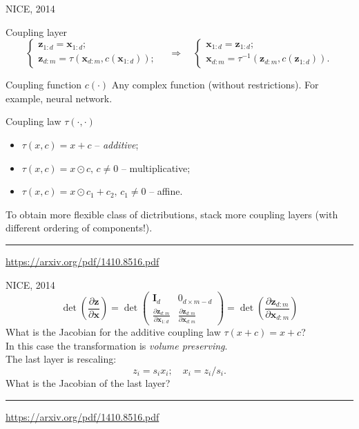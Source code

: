 \documentclass{beamer}
\newcommand{\bx}{\mathbf{x}}
\newcommand{\bz}{\mathbf{z}}
\newcommand{\bI}{\mathbf{I}}
\begin{document}
\begin{frame}{NICE, 2014}
	\begin{block}{Coupling layer}
		\vspace{-0.5cm}
		\begin{equation*}
			\begin{cases} \bz_{1:d} = \bx_{1:d}; \\ \bz_{d:m} = \tau (\bx_{d:m}, c(\bx_{1:d}));\end{cases} 
			\quad \Rightarrow \quad 
			\begin{cases} \bx_{1:d} = \bz_{1:d}; \\ \bx_{d:m} = \tau^{-1} (\bz_{d:m}, c(\bz_{1:d})).\end{cases}
		\end{equation*}
		\vspace{-0.5cm}
	\end{block}
	\begin{block}{Coupling function $c(\cdot)$}
		Any complex function (without restrictions). For example, neural network.
	\end{block}
	\begin{block}{Coupling law $\tau(\cdot, \cdot)$}
		\begin{itemize}
			\item $\tau(x, c) = x + c$ -- \textit{additive};
			\item $\tau(x, c) = x \odot c, \, c \neq 0$ -- multiplicative;
			\item $\tau(x, c) = x \odot c_1 + c_2, \, c_1 \neq 0$ -- affine.
		\end{itemize}
	\end{block}
	To obtain more flexible class of dictributions, stack more coupling layers (with different ordering of components!). \\
	
	\vfill
	\hrule\medskip
	{\scriptsize \href{https://arxiv.org/pdf/1410.8516.pdf}{https://arxiv.org/pdf/1410.8516.pdf}} 
\end{frame}
\begin{frame}{NICE, 2014}
	\[
	\det \left( \frac{\partial \bz}{\partial \bx} \right) = \det 
	\begin{pmatrix}
		\bI_d & 0_{d \times m - d} \\
		\frac{\partial \bz_{d:m}}{\partial \bx_{1:d}} & \frac{\partial \bz_{d:m}}{\partial \bx_{d:m}}
	\end{pmatrix} = 
	\det \left( \frac{\partial \bz_{d:m}}{\partial \bx_{d:m}} \right)
	\]
	What is the Jacobian for the additive coupling law $\tau(x + c) = x + c$? \\
	In this case the transformation is \textit{volume preserving}. \\
	The last layer is rescaling:
	\[
	z_i = s_i x_i; \quad x_i = z_i / s_i.
	\]
	What is the Jacobian of the last layer?
	\vfill
	\hrule\medskip
	{\scriptsize \href{https://arxiv.org/pdf/1410.8516.pdf}{https://arxiv.org/pdf/1410.8516.pdf}} 
\end{frame}
\end{document}
